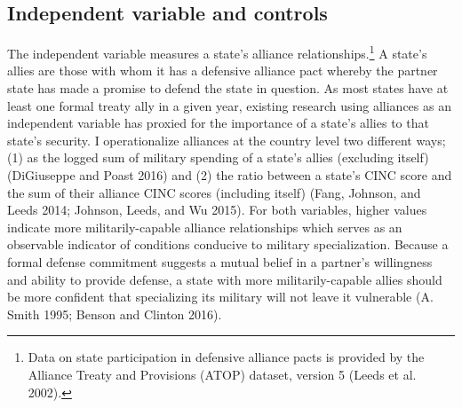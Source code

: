 \documentclass[
  12,
  letterpaper,
  DIV=11,
  numbers=noendperiod]{scrartcl}
\begin{document}
\hypertarget{independent-variable-and-controls}{%
\subsection{Independent variable and
controls}\label{independent-variable-and-controls}}

The independent variable measures a state's alliance
relationships.\footnote{Data on state participation in defensive
  alliance pacts is provided by the Alliance Treaty and Provisions
  (ATOP) dataset, version 5 (Leeds et al. 2002).} A state's allies are
those with whom it has a defensive alliance pact whereby the partner
state has made a promise to defend the state in question. As most states
have at least one formal treaty ally in a given year, existing research
using alliances as an independent variable has proxied for the
importance of a state's allies to that state's security. I
operationalize alliances at the country level two different ways; (1) as
the logged sum of military spending of a state's allies (excluding
itself) (DiGiuseppe and Poast 2016) and (2) the ratio between a state's
CINC score and the sum of their alliance CINC scores (including itself)
(Fang, Johnson, and Leeds 2014; Johnson, Leeds, and Wu 2015). For both
variables, higher values indicate more militarily-capable alliance
relationships which serves as an observable indicator of conditions
conducive to military specialization. Because a formal defense
commitment suggests a mutual belief in a partner's willingness and
ability to provide defense, a state with more militarily-capable allies
should be more confident that specializing its military will not leave
it vulnerable (A. Smith 1995; Benson and Clinton 2016).
\end{document}

